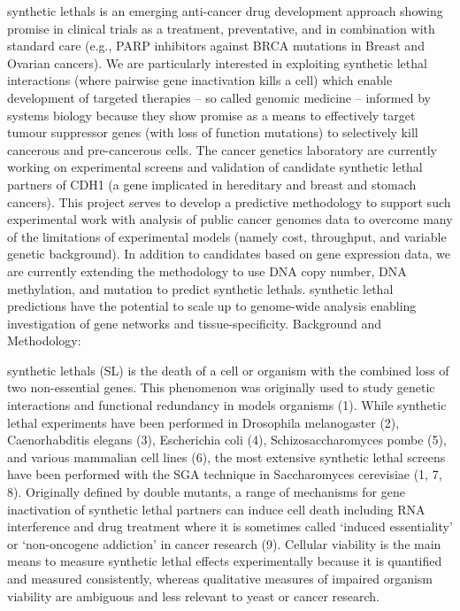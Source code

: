 \Glspl{synthetic lethal} is an emerging anti-cancer drug development approach showing promise in clinical trials as a treatment, preventative, and in combination with standard care (e.g., \gls{PARP} inhibitors against BRCA \glspl{mutation} in Breast and Ovarian cancers). We are particularly interested in exploiting \gls{synthetic lethal} interactions (where pairwise gene inactivation kills a cell) which enable development of targeted therapies – so called genomic medicine – informed by systems biology because they show promise as a means to effectively target \gls{tumour suppressor} genes (with loss of function \glspl{mutation}) to selectively kill cancerous and pre-cancerous cells. The cancer genetics laboratory are currently working on experimental screens and validation of candidate \gls{synthetic lethal} partners of CDH1 (a gene implicated in \gls{hereditary} and  breast and stomach cancers). This project serves to develop a predictive methodology to support such experimental work with analysis of public cancer \glspl{genome} data to overcome many of the limitations of experimental models (namely cost, throughput, and variable genetic background). In addition to candidates based on \gls{gene expression} data, we are currently extending the methodology to use \acrshort{DNA} copy number, \acrshort{DNA} methylation, and  \gls{mutation} to predict \glspl{synthetic lethal}. \Gls{synthetic lethal} predictions have the potential to scale up to \gls{genome}-wide analysis enabling investigation of gene networks and tissue-specificity.
Background and Methodology:

\Glspl{synthetic lethal} (SL) is the death of a cell or organism with the combined loss of two non-\gls{essential} genes. This phenomenon was originally used to study genetic interactions and \gls{functional redundancy} in models organisms (1). While \gls{synthetic lethal} experiments have been performed in Drosophila melanogaster (2), Caenorhabditis elegans (3), Escherichia coli (4), Schizosaccharomyces pombe (5), and various mammalian cell lines (6), the most extensive \gls{synthetic lethal} screens have been performed with the \gls{SGA} technique in Saccharomyces cerevisiae (1, 7, 8). Originally defined by double \glspl{mutant}, a range of mechanisms for gene inactivation of \gls{synthetic lethal} partners can induce cell death including \acrshort{RNA} interference and drug treatment where it is sometimes called ‘\gls{induced essentiality}’ or ‘\gls{non-oncogene addiction}’ in cancer research (9). Cellular viability is the main means to measure \gls{synthetic lethal} effects experimentally because it is quantified and measured consistently, whereas qualitative measures of impaired organism viability are ambiguous and less relevant to yeast or cancer research.

